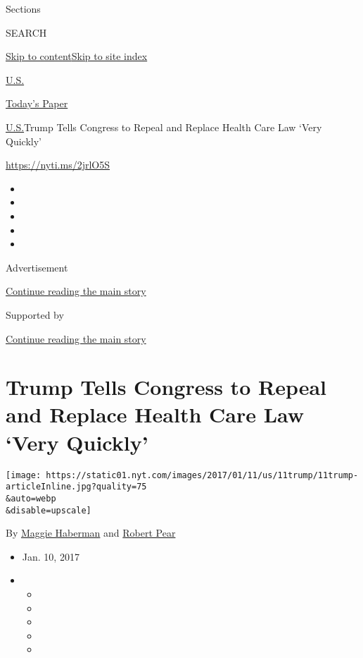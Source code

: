 Sections

SEARCH

\protect\hyperlink{site-content}{Skip to
content}\protect\hyperlink{site-index}{Skip to site index}

\href{https://www.nytimes.com/section/us}{U.S.}

\href{https://myaccount.nytimes.com/auth/login?response_type=cookie\&client_id=vi}{}

\href{https://www.nytimes.com/section/todayspaper}{Today's Paper}

\href{/section/us}{U.S.}\textbar{}Trump Tells Congress to Repeal and
Replace Health Care Law `Very Quickly'

\url{https://nyti.ms/2jrlO5S}

\begin{itemize}
\item
\item
\item
\item
\item
\end{itemize}

Advertisement

\protect\hyperlink{after-top}{Continue reading the main story}

Supported by

\protect\hyperlink{after-sponsor}{Continue reading the main story}

\hypertarget{trump-tells-congress-to-repeal-and-replace-health-care-law-very-quickly}{%
\section{Trump Tells Congress to Repeal and Replace Health Care Law
`Very
Quickly'}\label{trump-tells-congress-to-repeal-and-replace-health-care-law-very-quickly}}

\texttt{[image: https://static01.nyt.com/images/2017/01/11/us/11trump/11trump-articleInline.jpg?quality=75\\\&auto=webp\\\&disable=upscale]}

By \href{http://www.nytimes.com/by/maggie-haberman}{Maggie Haberman} and
\href{https://www.nytimes.com/by/robert-pear}{Robert Pear}

\begin{itemize}
\item
  Jan. 10, 2017
\item
  \begin{itemize}
  \item
  \item
  \item
  \item
  \item
  \end{itemize}
\end{itemize}

